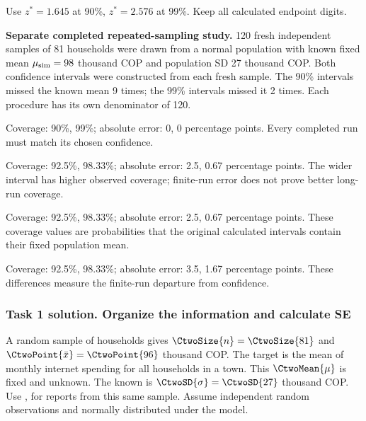 Use $z^*=1.645$ at 90\%, $z^*=2.576$ at 99\%. Keep all calculated endpoint digits.

\textbf{Separate completed repeated-sampling study.} 120 fresh independent samples of 81 households were drawn from a normal population with known fixed mean $\mu_{\rm sim}=98$ thousand COP and population SD 27 thousand COP. Both confidence intervals were constructed from each fresh sample.
The 90\% intervals missed the known mean 9 times; the 99\% intervals missed it 2 times. Each procedure has its own denominator of 120.

\begin{answeroptions}
\item Coverage: 90\%, 99\%; absolute error: 0, 0 percentage points. Every completed run must match its chosen confidence.
\item Coverage: 92.5\%, 98.33\%; absolute error: 2.5, 0.67 percentage points. The wider interval has higher observed coverage; finite-run error does not prove better long-run coverage.
\item Coverage: 92.5\%, 98.33\%; absolute error: 2.5, 0.67 percentage points. These coverage values are probabilities that the original calculated intervals contain their fixed population mean.
\item Coverage: 92.5\%, 98.33\%; absolute error: 3.5, 1.67 percentage points. These differences measure the finite-run departure from confidence.
\end{answeroptions}
\clearpage
\subsubsection*{Task 1 solution. Organize the information and calculate SE}
\label{sol:c2-advanced-b-a}
A random sample of  households gives $\CtwoSize{n}=\CtwoSize{81}$ and  $\CtwoPoint{\bar{x}}=\CtwoPoint{96}$ thousand COP. The target is the mean of monthly internet spending for all households in a town. This  $\CtwoMean{\mu}$ is fixed and unknown. The known  is $\CtwoSD{\sigma}=\CtwoSD{27}$ thousand COP. Use ,   for reports from this same sample. Assume independent random observations and normally distributed  under the model.

